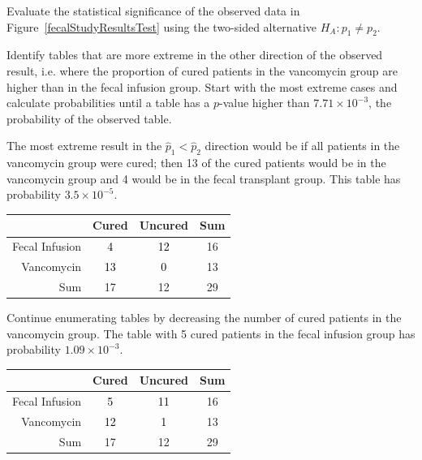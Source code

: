 \begin{examplewrap}
\begin{nexample}{Evaluate the statistical significance of the observed data in Figure~\ref{fecalStudyResultsTest} using the two-sided alternative $H_A: p_1 \neq p_2$.}

Identify tables that are more extreme in the other direction of the observed result, i.e. where the proportion of cured patients in the vancomycin group are higher than in the fecal infusion group. Start with the most extreme cases and calculate probabilities until a table has a $p$-value higher than $7.71 \times 10^{-3}$, the probability of the observed table.

The most extreme result in the $\hat{p}_1 < \hat{p}_2$ direction would be if all patients in the vancomycin group were cured; then 13 of the cured patients would be in the vancomycin group and 4 would be in the fecal transplant group. This table has probability $3.5 \times 10^{-5}$.

\begin{center}
	\color{gray}
	\begin{tabular}{r|cc|c}
		\hline
		& Cured & Uncured & Sum \\
		\hline
		Fecal Infusion & \textcolor{black}{4} & \textcolor{black}{12} & 16 \\
		Vancomycin & \textcolor{black}{13} & \textcolor{black}{0} & 13 \\
		\hline
		Sum & 17 & 12 & 29 \\
		\hline
	\end{tabular}
\end{center}

Continue enumerating tables by decreasing the number of cured patients in the vancomycin group. The table with 5 cured patients in the fecal infusion group has probability $1.09 \times 10^{-3}$.

\begin{center}
	\color{gray}
	\begin{tabular}{r|cc|c}
		\hline
		& Cured & Uncured & Sum \\
		\hline
		Fecal Infusion & \textcolor{black}{5} & \textcolor{black}{11} & 16 \\
		Vancomycin & \textcolor{black}{12} & \textcolor{black}{1} & 13 \\
		\hline
		Sum & 17 & 12 & 29 \\
		\hline
	\end{tabular}
\end{center}


\end{nexample}
\end{examplewrap}
